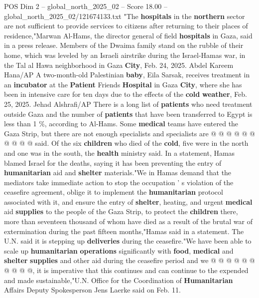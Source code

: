 \begin{textsample}{POS Dim 2 – global\_north\_2025\_02 – Score 18.00 – global\_north\_2025\_02/121674133.txt}  \label{ex:f2_pos_440}
"The \textbf{hospitals} in the \textbf{northern} sector are not sufficient to provide services to citizens after returning to their places of residence,"Marwan Al-Hams, the director general of field \textbf{hospitals} in Gaza, said in a press release.
Members of the Dwaima family stand on the rubble of their home, which was leveled by an Israeli airstrike during the Israel-Hamas war, in the Tal al Hawa neighborhood in Gaza \textbf{City}, Feb. 24, 2025.
Abdel Kareem Hana/AP A two-month-old Palestinian \textbf{baby}, Eila Sarsak, receives treatment in an \textbf{incubator} at the \textbf{Patient} Friends \textbf{Hospital} in Gaza \textbf{City}, where she has been in intensive care for ten days due to the effects of the \textbf{cold} \textbf{weather}, Feb. 25, 2025.
Jehad Alshrafi/AP There is a long list of \textbf{patients} who need treatment outside Gaza and the number of \textbf{patients} that have been transferred to Egypt is less than 1 \%, according to Al-Hams.
Some \textbf{medical} teams have entered the Gaza Strip, but there are not enough specialists and specialists are @ @ @ @ @ @ @ @ @ @ said.
Of the six \textbf{children} who died of the \textbf{cold}, five were in the north and one was in the south, the \textbf{health} ministry said.
In a statement, Hamas blamed Israel for the deaths, saying it has been preventing the entry of \textbf{humanitarian} aid and \textbf{shelter} materials."We in Hamas demand that the mediators take immediate action to stop the occupation ' s violation of the ceasefire agreement, oblige it to implement the \textbf{humanitarian} protocol associated with it, and ensure the entry of \textbf{shelter}, heating, and urgent \textbf{medical} aid \textbf{supplies} to the people of the Gaza Strip, to protect the \textbf{children} there, more than seventeen thousand of whom have died as a result of the brutal war of extermination during the past fifteen months,"Hamas said in a statement.
The U.N. said it is stepping up \textbf{deliveries} during the ceasefire."We have been able to scale up \textbf{humanitarian} \textbf{operations} significantly with \textbf{food}, \textbf{medical} and \textbf{shelter} \textbf{supplies} and other aid during the ceasefire period and we @ @ @ @ @ @ @ @ @ @, it is imperative that this continues and can continue to the expended and made sustainable,"U.N.
Office for the Coordination of \textbf{Humanitarian} Affairs Deputy Spokesperson Jens Laerke said on Feb. 11.

\end{textsample}
